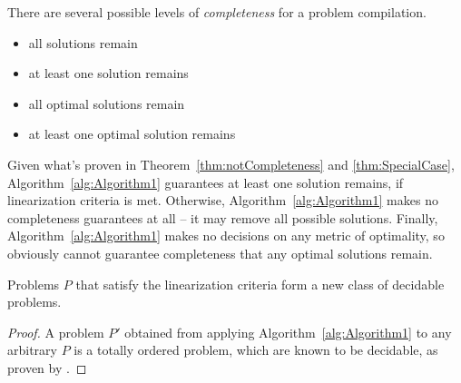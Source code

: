 There are several possible levels of \emph{completeness} for a problem compilation.
\begin{itemize}
	\item all solutions remain
	\item at least one solution remains
	\item all optimal solutions remain
	\item at least one optimal solution remains
\end{itemize}
Given what's proven in Theorem~\ref{thm:notCompleteness} and \ref{thm:SpecialCase}, Algorithm~\ref{alg:Algorithm1} guarantees at least one solution remains, if linearization criteria is met. Otherwise, Algorithm~\ref{alg:Algorithm1} makes no completeness guarantees at all -- it may remove all possible solutions. Finally, Algorithm~\ref{alg:Algorithm1} makes no decisions on any metric of optimality, so obviously cannot guarantee completeness that any optimal solutions remain.


\begin{theorem}\label{thm:newClass}
	Problems $P$ that satisfy the linearization criteria form a new class of decidable problems.
\end{theorem}
\begin{proof}
	A problem $P'$ obtained from applying Algorithm~\ref{alg:Algorithm1} to any arbitrary $P$ is a totally ordered problem, which are known to be decidable, as proven by \cite{Alford2015TightHTNBounds}.
\end{proof}

